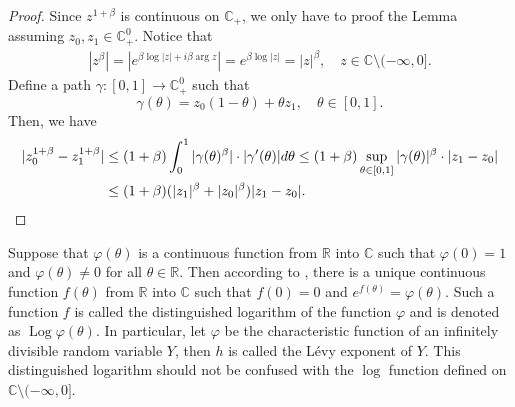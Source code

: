 \documentclass[12pt]{amsart}
\theoremstyle{plain}
\theoremstyle{definition}
\numberwithin{equation}{section}
\begin{document}
\begin{proof}
    Since $z^{1+\beta}$ is continuous on $\mathbb C_+$, we only have to proof the Lemma assuming $z_0,z_1 \in \mathbb C^0_+$.
    Notice that
\begin{align}
\label{eq: upper bound for beta power of z}
	|z^\beta| 
	= |e^{\beta \log |z| +i\beta \operatorname {arg}z}| = e^{\beta \log |z|} = |z|^\beta,
	\quad z \in \mathbb C\setminus (-\infty, 0].
\end{align}
    Define a path $\gamma: [0,1] \to \mathbb C^0_+$ such that
\[
    \gamma(\theta)
    = z_0 (1-\theta) + \theta z_1,
    \quad \theta \in [0,1].
\]
    Then, we have
\begin{align}
    |z_0^{1+\beta} - z_1^{1+\beta}|
    &\leq (1+\beta) \int_0^1 |\gamma(\theta)^{\beta}|\cdot |\gamma'(\theta)|d\theta
    \leq (1+\beta)  \sup_{\theta \in [0,1]} |\gamma(\theta)|^{\beta} \cdot |z_1-z_0|
    \\&\leq (1+\beta)  ( |z_1|^{\beta}+|z_0|^{\beta} ) |z_1-z_0|.
    \qedhere
\end{align}
\end{proof}

	Suppose that $\varphi(\theta)$ is a continuous function from $\mathbb R$ into $\mathbb C$ such that $\varphi(0) = 1$ and $\varphi(\theta) \neq 0$ for all $\theta \in \mathbb R$. 
	Then according to \cite[Lemma 7.6]{Sato1999Levy}, there is a unique continuous function $f(\theta)$ from $\mathbb R$ into $\mathbb C$ such that $f(0) = 0$ and $e^{f(\theta)} = \varphi(\theta)$. 
	Such a function $f$ is called the distinguished logarithm of the function $\varphi$ and is denoted as $\operatorname{Log} \varphi(\theta)$.
	In particular, let $\varphi$ be the characteristic function of an infinitely divisible random variable $Y$, then $h$ is called the L\'evy exponent of $Y$. 
	This distinguished logarithm should not be confused with the $\log$ function defined on $\mathbb C\setminus (-\infty, 0]$.
\end{document}
